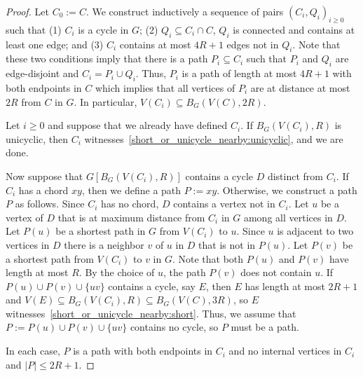 \documentclass{patmorin}
\begin{document}
\begin{proof}
  Let $C_0:=C$.
  We construct inductively a sequence of pairs $(C_i,Q_i)_{i\geq0}$ such that
  (1) $C_i$ is a cycle in $G$;
  (2) $Q_i\subseteq C_i\cap C$, $Q_i$ is connected and contains at least one edge; and
  (3) $C_i$ contains at most $4R+1$ edges not in $Q_i$.
  Note that these two conditions imply that there is a path $P_i\subseteq C_i$  such that
  $P_i$ and $Q_i$ are edge-disjoint and $C_i=P_i\cup Q_i$.
  Thus, $P_i$ is a path of length at most $4R+1$ with both endpoints in $C$
  which implies that all vertices of $P_i$ are at distance at most $2R$ from $C$ in $G$.
  In particular, $V(C_i)\subseteq B_G(V(C),2R)$.

  Let $i\geq0$ and suppose that we already have defined $C_i$.
  If $B_G(V(C_i),R)$ is unicyclic, then $C_i$ witnesses~\eqref{short_or_unicycle_nearby:unicyclic}, and we are done. 

  Now suppose that $G[B_G(V(C_i),R)]$ contains a cycle $D$ distinct from $C_i$.  If $C_i$ has a chord $xy$, then we define a path $P:=xy$.  Otherwise, we construct a path $P$ as follows. Since $C_i$ has no chord, $D$ contains a vertex not in $C_i$.  Let $u$ be a vertex of $D$ that is at maximum distance from $C_i$ in $G$ among all vertices in $D$.
  Let $P(u)$ be a shortest path in $G$ from $V(C_i)$ to $u$. 
  Since $u$ is adjacent to two vertices in $D$ there is a neighbor $v$ of $u$ in $D$ that is not in $P(u)$.
  Let $P(v)$ be a shortest path from $V(C_i)$ to $v$ in $G$.
  Note that both $P(u)$ and $P(v)$ have length at most $R$.
  By the choice of $u$, the path $P(v)$ does not contain $u$.
  If $P(u)\cup P(v)\cup\{uv\}$ contains a cycle, say $E$, then $E$ has length at most $2R+1$ and $V(E)\subseteq B_G(V(C_i),R)\subseteq B_G(V(C),3R)$, so $E$ witnesses~\eqref{short_or_unicycle_nearby:short}.
  Thus, we assume that $P:=P(u)\cup P(v)\cup\{uv\}$ contains no cycle, so $P$ must be a path.

  In each case, $P$ is a path with both endpoints in $C_i$ and no internal vertices in $C_i$ and $|P|\le 2R+1$.


\end{proof}
\end{document}
